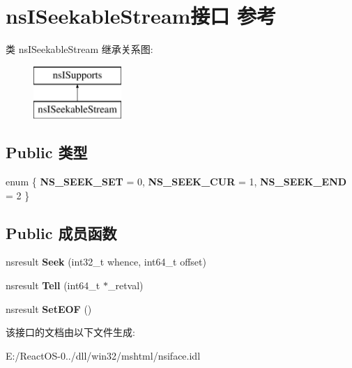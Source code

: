 \hypertarget{interfacens_i_seekable_stream}{}\section{ns\+I\+Seekable\+Stream接口 参考}
\label{interfacens_i_seekable_stream}
类 ns\+I\+Seekable\+Stream 继承关系图\+:\begin{figure}[H]
\begin{center}
\leavevmode
\includegraphics[height=2.000000cm]{interfacens_i_seekable_stream}
\end{center}
\end{figure}
\subsection*{Public 类型}
\begin{DoxyCompactItemize}
\item 
\mbox{\label{interfacens_i_seekable_stream_a67a1b692d2cb692684ab31cd6463026c}} 
enum \{ {\bfseries N\+S\+\_\+\+S\+E\+E\+K\+\_\+\+S\+ET} = 0, 
{\bfseries N\+S\+\_\+\+S\+E\+E\+K\+\_\+\+C\+UR} = 1, 
{\bfseries N\+S\+\_\+\+S\+E\+E\+K\+\_\+\+E\+ND} = 2
 \}
\end{DoxyCompactItemize}
\subsection*{Public 成员函数}
\begin{DoxyCompactItemize}
\item 
\mbox{\label{interfacens_i_seekable_stream_a6ae7bce1031325fc11de17f36b75f799}} 
nsresult {\bfseries Seek} (int32\+\_\+t whence, int64\+\_\+t offset)
\item 
\mbox{\label{interfacens_i_seekable_stream_a8bc68dbbe75d4a01a8c0cc8a4e1a6b24}} 
nsresult {\bfseries Tell} (int64\+\_\+t $\ast$\+\_\+retval)
\item 
\mbox{\label{interfacens_i_seekable_stream_a2789e9f53a6e8df24b76dffaccb4980a}} 
nsresult {\bfseries Set\+E\+OF} ()
\end{DoxyCompactItemize}


该接口的文档由以下文件生成\+:\begin{DoxyCompactItemize}
\item 
E\+:/\+React\+O\+S-\/0../dll/win32/mshtml/nsiface.\+idl\end{DoxyCompactItemize}
